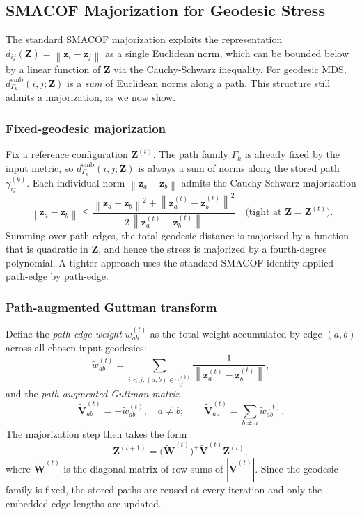 \documentclass[11pt]{article}
\newcommand{\bz}{\mathbf{z}}
\newcommand{\bZ}{\mathbf{Z}}
\newcommand{\bV}{\mathbf{V}}
\newcommand{\bW}{\mathbf{W}}
\newcommand{\norm}[1]{\left\|#1\right\|}
\newcommand{\demb}{d^{\mathrm{emb}}}
\begin{document}
\subsection{SMACOF Majorization for Geodesic Stress}
\label{sec:geo_smacof}

The standard SMACOF majorization exploits the representation
$d_{ij}(\bZ) = \norm{\bz_i - \bz_j}$ as a single Euclidean norm, which
can be bounded below by a linear function of $\bZ$ via the Cauchy-Schwarz
inequality.  For geodesic MDS, $\demb_{\Gamma_k}(i,j;\bZ)$ is a \emph{sum} of
Euclidean norms along a path.  This structure still admits a majorization,
as we now show.

\subsubsection*{Fixed-geodesic majorization}
Fix a reference configuration $\bZ^{(t)}$.  The path family $\Gamma_k$ is
already fixed by the input metric, so $\demb_{\Gamma_k}(i,j;\bZ)$ is always a sum
of norms along the stored path $\gamma_{ij}^{(k)}$.  Each
individual norm $\norm{\bz_a - \bz_b}$ admits the Cauchy-Schwarz majorization
\begin{equation}
  \norm{\bz_a - \bz_b}
  \leq
  \frac{\norm{\bz_a - \bz_b}^2 + \norm{\bz^{(t)}_a - \bz^{(t)}_b}^2}
       {2\,\norm{\bz^{(t)}_a - \bz^{(t)}_b}}
  \quad \text{(tight at } \bZ = \bZ^{(t)}\text{)}.
  \label{eq:cs_majorization}
\end{equation}
Summing over path edges, the total geodesic distance is majorized by a
function that is quadratic in $\bZ$, and hence the stress is majorized by
a fourth-degree polynomial.  A tighter approach uses the standard SMACOF
identity applied path-edge by path-edge.

\subsubsection*{Path-augmented Guttman transform}
Define the \emph{path-edge weight} $\tilde{w}_{ab}^{(t)}$ as the total
weight accumulated by edge $(a,b)$ across all chosen input geodesics:
\begin{equation}
  \tilde{w}_{ab}^{(t)}
  = \sum_{i < j : (a,b) \in \gamma_{ij}^{(k)}}
    \frac{1}{\norm{\bz^{(t)}_a - \bz^{(t)}_b}},
  \label{eq:path_edge_weight}
\end{equation}
and the \emph{path-augmented Guttman matrix}
\begin{equation}
  \tilde{\bV}^{(t)}_{ab}
  = -\tilde{w}^{(t)}_{ab}, \quad a \neq b; \qquad
  \tilde{\bV}^{(t)}_{aa}
  = \sum_{b \neq a} \tilde{w}^{(t)}_{ab}.
  \label{eq:augmented_guttman}
\end{equation}
The majorization step then takes the form
\begin{equation}
  \bZ^{(t+1)} = \bigl(\tilde{\bW}^{(t)}\bigr)^+ \tilde{\bV}^{(t)} \bZ^{(t)},
  \label{eq:geo_guttman_update}
\end{equation}
where $\tilde{\bW}^{(t)}$ is the diagonal matrix of row sums of
$|\tilde{\bV}^{(t)}|$.  Since the geodesic family is fixed, the stored
paths are reused at every iteration and only the embedded edge lengths are
updated.
\end{document}

